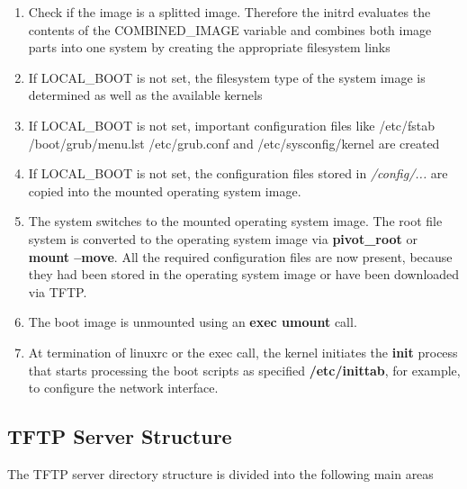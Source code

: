 \begin{enumerate}
	\item Check if the image is a splitted image. Therefore the initrd
          evaluates the contents of the COMBINED\_IMAGE variable and
          combines both image parts into one system by creating the
          appropriate filesystem links
	\item If LOCAL\_BOOT is not set, the filesystem type of the system
          image is determined as well as the available kernels
	\item If LOCAL\_BOOT is not set, important configuration files
          like /etc/fstab /boot/grub/menu.lst /etc/grub.conf and
          /etc/sysconfig/kernel are created
	\item If LOCAL\_BOOT is not set, the configuration files stored
          in \textit{/config/...} are copied
          into the mounted operating system image.
	\item The system switches to the mounted operating system image. The root
          file system is converted to the operating system image via
          \textbf{pivot\_root} or \textbf{mount --move}. All the required
          configuration files are
          now present, because they had been stored in the operating system
          image or have been downloaded via TFTP.
	\item The boot image is unmounted using an \textbf{exec umount} call.
	\item At termination of linuxrc or the exec call, the kernel initiates
          the \textbf{init} process that starts processing the boot
          scripts as specified \textbf{/etc/inittab}, for example,
          to configure the network interface.
\end{enumerate}

\subsection{TFTP Server Structure}
\label{section:tftpstruct}
The TFTP server directory structure is divided into the following main areas

